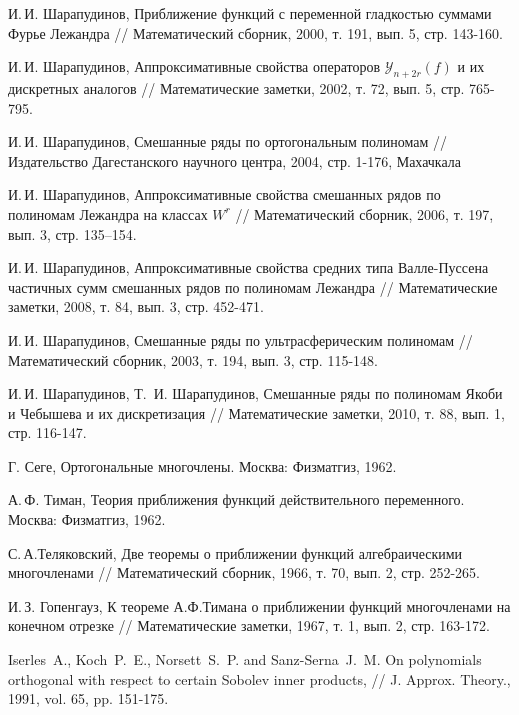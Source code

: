  И.\,И. Шарапудинов, Приближение функций с переменной гладкостью суммами Фурье Лежандра // Математический сборник, 2000, т. 191, вып. 5, стр. 143-160.


 И.\,И. Шарапудинов, Аппроксимативные свойства операторов $\mathcal{Y}_{n+2r}(f)$ и их дискретных аналогов // Математические заметки, 2002, т. 72, вып. 5, стр. 765-795.

 И.\,И. Шарапудинов, Смешанные ряды по ортогональным полиномам // Издательство Дагестанского научного центра, 2004, стр. 1-176, Махачкала




 И.\,И. Шарапудинов, Аппроксимативные свойства смешанных рядов по полиномам Лежандра на классах $W^r$ // Математический сборник, 2006, т. 197, вып. 3, стр. 135–154.


 И.\,И. Шарапудинов, Аппроксимативные свойства средних типа Валле-Пуссена частичных сумм смешанных рядов по полиномам Лежандра // Математические заметки, 2008, т. 84, вып. 3, стр. 452-471.

 И.\,И. Шарапудинов, Смешанные ряды по ультрасферическим полиномам // Математический сборник, 2003, т. 194, вып. 3, стр. 115-148.




 И.\,И. Шарапудинов, Т.\, И. Шарапудинов, Смешанные ряды по полиномам Якоби и Чебышева и их дискретизация // Математические заметки, 2010, т. 88, вып. 1, стр. 116-147.





 Г. Сеге, Ортогональные многочлены. Москва: Физматгиз, 1962.

 А.\,Ф. Тиман, Теория приближения функций действительного переменного. Москва: Физматгиз, 1962.

 С.\,А.Теляковский, Две теоремы о приближении функций
алгебраическими многочленами // Математический сборник, 1966, т. 70, вып. 2, стр. 252-265.

 И.\,З. Гопенгауз, К теореме А.Ф.Тимана о приближении
функций многочленами на конечном отрезке // Математические заметки, 1967, т. 1, вып. 2, стр. 163-172. 

 Iserles~A., Koch~P.~E., Norsett~S.~P. and Sanz-Serna~J.~M. On polynomials orthogonal with respect to certain Sobolev inner products, // J. Approx. Theory., 1991, vol. 65, pp. 151-175.

